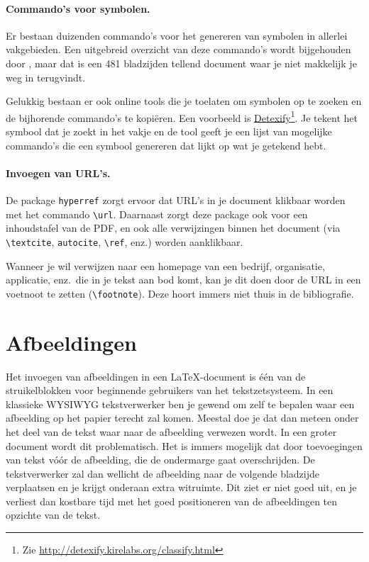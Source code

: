 \paragraph*{Commando's voor symbolen.}

Er bestaan duizenden commando's voor het genereren van symbolen in allerlei vakgebieden. Een uitgebreid overzicht van deze commando's wordt bijgehouden door \textcite{Pakin2024}, maar dat is een 481 bladzijden tellend document waar je niet makkelijk je weg in terugvindt.

Gelukkig bestaan er ook online tools die je toelaten om symbolen op te zoeken en de bijhorende commando's te kopiëren. Een voorbeeld is \href{http://detexify.kirelabs.org/classify.html}{Detexify}\footnote{Zie \url{http://detexify.kirelabs.org/classify.html}}. Je tekent het symbool dat je zoekt in het vakje en de tool geeft je een lijst van mogelijke commando's die een symbool genereren dat lijkt op wat je getekend hebt.

\paragraph*{Invoegen van URL's.}

De package \texttt{hyperref} zorgt ervoor dat URL's in je document klikbaar worden met het commando \verb+\url+. Daarnaast zorgt deze package ook voor een inhoudstafel van de PDF, en ook alle verwijzingen binnen het document (via \verb+\textcite+, \verb+autocite+, \verb+\ref+, enz.) worden aanklikbaar.

Wanneer je wil verwijzen naar een homepage van een bedrijf, organisatie, applicatie, enz.\ die in je tekst aan bod komt, kan je dit doen door de URL in een voetnoot te zetten (\verb+\footnote+). Deze hoort immers niet thuis in de bibliografie.

\section{Afbeeldingen}%
\label{sec:afbeeldingen}

Het invoegen van afbeeldingen in een {\LaTeX}-document is \'e\'en van de struikelblokken voor beginnende gebruikers van het tekstzetsysteem. In een klassieke WYSIWYG tekstverwerker ben je gewend om zelf te bepalen waar een afbeelding op het papier terecht zal komen. Meestal doe je dat dan meteen onder het deel van de tekst waar naar de afbeelding verwezen wordt. In een groter document wordt dit problematisch. Het is immers mogelijk dat door toevoegingen van tekst vóór de afbeelding, die de ondermarge gaat overschrijden. De tekstverwerker zal dan wellicht de afbeelding naar de volgende bladzijde verplaatsen en je krijgt onderaan extra witruimte. Dit ziet er niet goed uit, en je verliest dan kostbare tijd met het goed positioneren van de afbeeldingen ten opzichte van de tekst.

